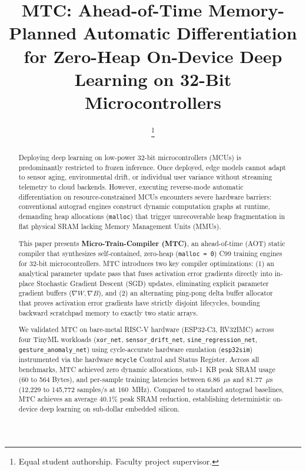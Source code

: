 \documentclass[conference]{IEEEtran}
\begin{document}
\title{MTC: Ahead-of-Time Memory-Planned Automatic Differentiation for Zero-Heap On-Device Deep Learning on 32-Bit Microcontrollers}

\author{
    \thanks{Equal student authorship. Faculty project supervisor.}
}

\maketitle

\begin{abstract}
Deploying deep learning on low-power 32-bit microcontrollers (MCUs) is predominantly restricted to frozen inference. Once deployed, edge models cannot adapt to sensor aging, environmental drift, or individual user variance without streaming telemetry to cloud backends. However, executing reverse-mode automatic differentiation on resource-constrained MCUs encounters severe hardware barriers: conventional autograd engines construct dynamic computation graphs at runtime, demanding heap allocations (\texttt{malloc}) that trigger unrecoverable heap fragmentation in flat physical SRAM lacking Memory Management Units (MMUs). 

This paper presents \textbf{Micro-Train-Compiler (MTC)}, an ahead-of-time (AOT) static compiler that synthesizes self-contained, zero-heap (\texttt{malloc = 0}) C99 training engines for 32-bit microcontrollers. MTC introduces two key compiler optimizations: (1) an analytical parameter update pass that fuses activation error gradients directly into in-place Stochastic Gradient Descent (SGD) updates, eliminating explicit parameter gradient buffers ($\nabla W, \nabla B$), and (2) an alternating ping-pong delta buffer allocator that proves activation error gradients have strictly disjoint lifecycles, bounding backward scratchpad memory to exactly two static arrays. 

We validated MTC on bare-metal RISC-V hardware (ESP32-C3, RV32IMC) across four TinyML workloads (\texttt{xor\_net}, \texttt{sensor\_drift\_net}, \texttt{sine\_regression\_net}, \texttt{gesture\_anomaly\_net}) using cycle-accurate hardware emulation (\texttt{esp32sim}) instrumented via the hardware \texttt{mcycle} Control and Status Register. Across all benchmarks, MTC achieved zero dynamic allocations, sub-1~KB peak SRAM usage (60 to 564 Bytes), and per-sample training latencies between 6.86~$\mu$s and 81.77~$\mu$s (12,229 to 145,772 samples/s at 160~MHz). Compared to standard autograd baselines, MTC achieves an average 40.1\% peak SRAM reduction, establishing deterministic on-device deep learning on sub-dollar embedded silicon.
\end{abstract}
\end{document}
